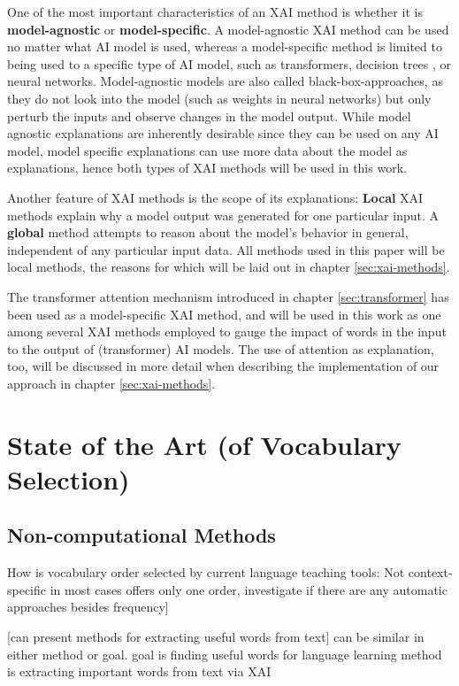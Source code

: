 One of the most important characteristics of an XAI method is whether it is \textbf{model-agnostic} or \textbf{model-specific}.
A model-agnostic XAI method can be used no matter what AI model is used, whereas a model-specific method is limited to being used to a specific type of AI model, such as transformers, decision trees , or neural networks.
Model-agnostic models are also called black-box-approaches, as they do not look into the model (such as weights in neural networks) but only perturb the inputs and observe changes in the model output.
While model agnostic explanations are inherently desirable since they can be used on any AI model, model specific explanations can use more data about the model as explanations, hence both types of XAI methods will be used in this work.

Another feature of XAI methods is the scope of its explanations:
\textbf{Local} XAI methods explain why a model output was generated for one particular input.
A \textbf{global} method attempts to reason about the model's behavior in general, independent of any particular input data.
All methods used in this paper will be local methods, the reasons for which will be laid out in chapter \ref{sec:xai-methods}.

The transformer attention mechanism introduced in chapter \ref{sec:transformer} has been used as a model-specific XAI method, and will be used in this work as one among several XAI methods employed to gauge the impact of words in the input to the output of (transformer) AI models.
The use of attention as explanation, too, will be discussed in more detail when describing the implementation of our approach in chapter \ref{sec:xai-methods}.


\section{State of the Art (of Vocabulary Selection)} \label{sec:state-of-the-art-vocabulary-selection}
\subsection{Non-computational Methods}
How is vocabulary order selected by current language teaching tools:
Not context-specific in most cases
offers only one order,
investigate if there are any automatic approaches besides frequency]

[can present methods for extracting useful words from text]
can be similar in either method or goal.
goal is finding useful words for language learning
method is extracting important words from text via XAI

